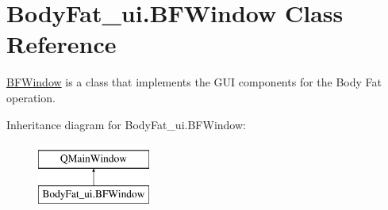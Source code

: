 \hypertarget{class_body_fat__ui_1_1_b_f_window}{}\section{Body\+Fat\+\_\+ui.\+B\+F\+Window Class Reference}
\label{class_body_fat__ui_1_1_b_f_window}


\hyperlink{class_body_fat__ui_1_1_b_f_window}{B\+F\+Window} is a class that implements the G\+UI components for the Body Fat operation.  


Inheritance diagram for Body\+Fat\+\_\+ui.\+B\+F\+Window\+:\begin{figure}[H]
\begin{center}
\leavevmode
\includegraphics[height=2.000000cm]{class_body_fat__ui_1_1_b_f_window}
\end{center}
\end{figure}
